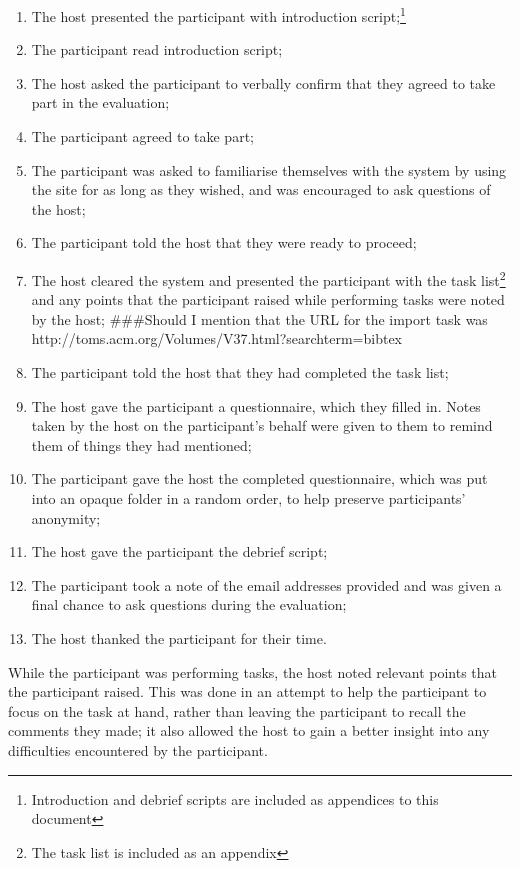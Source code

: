 \documentclass{l4proj}
\newcommand{\revisit}{\#\#\#}
\begin{document}
\begin{enumerate}
	\item The host presented the participant with introduction script;\footnote{Introduction and debrief scripts are included as appendices to this document}
	\item The participant read introduction script;
	\item The host asked the participant to verbally confirm that they agreed to take part in the evaluation;
	\item The participant agreed to take part;
	\item The participant was asked to familiarise themselves with the system by using the site for as long as they wished, and was encouraged to ask questions of the host;
	\item The participant told the host that they were ready to proceed;
	\item The host cleared the system and presented the participant with the task list\footnote{The task list is included as an appendix} and any points that the participant raised while performing tasks were noted by the host; \revisit Should I mention that the URL for the import task was http://toms.acm.org/Volumes/V37.html?searchterm=bibtex
	\item The participant told the host that they had completed the task list;
	\item The host gave the participant a questionnaire, which they filled in. Notes taken by the host on the participant's behalf were given to them to remind them of things they had mentioned;
	\item The participant gave the host the completed questionnaire, which was put into an opaque folder in a random order, to help preserve participants' anonymity;
	\item The host gave the participant the debrief script;
	\item The participant took a note of the email addresses provided and was given a final chance to ask questions during the evaluation;
	\item The host thanked the participant for their time.
\end{enumerate}

While the participant was performing tasks, the host noted relevant points that the participant raised.  This was done in an attempt to help the participant to focus on the task at hand, rather than leaving the participant to recall the comments they made; it also allowed the host to gain a better insight into any difficulties encountered by the participant.
\end{document}
